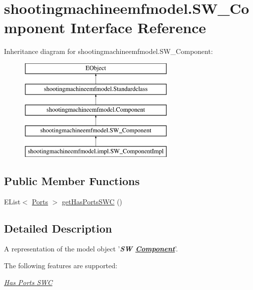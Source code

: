 \hypertarget{interfaceshootingmachineemfmodel_1_1_s_w___component}{\section{shootingmachineemfmodel.\-S\-W\-\_\-\-Component Interface Reference}
\label{interfaceshootingmachineemfmodel_1_1_s_w___component}
}
Inheritance diagram for shootingmachineemfmodel.\-S\-W\-\_\-\-Component\-:\begin{figure}[H]
\begin{center}
\leavevmode
\includegraphics[height=5.000000cm]{interfaceshootingmachineemfmodel_1_1_s_w___component}
\end{center}
\end{figure}
\subsection*{Public Member Functions}
\begin{DoxyCompactItemize}
\item 
E\-List$<$ \hyperlink{interfaceshootingmachineemfmodel_1_1_ports}{Ports} $>$ \hyperlink{interfaceshootingmachineemfmodel_1_1_s_w___component_a5f5305fa3eaa1aff6b5f251140381887}{get\-Has\-Ports\-S\-W\-C} ()
\end{DoxyCompactItemize}


\subsection{Detailed Description}
A representation of the model object '{\itshape {\bfseries S\-W \hyperlink{interfaceshootingmachineemfmodel_1_1_component}{Component}}}'.

The following features are supported\-: 
\begin{DoxyItemize}
\item \hyperlink{interfaceshootingmachineemfmodel_1_1_s_w___component_a5f5305fa3eaa1aff6b5f251140381887}{{\itshape Has Ports S\-W\-C}} 
\end{DoxyItemize}

